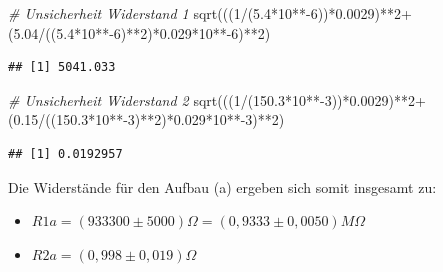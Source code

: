 \documentclass[class=article, crop=false]{standalone}
\newenvironment{Shaded}{\begin{snugshade}}{\end{snugshade}}
\newcommand{\CommentTok}[1]{\textcolor[rgb]{0.56,0.35,0.01}{\textit{#1}}}
\newcommand{\DecValTok}[1]{\textcolor[rgb]{0.00,0.00,0.81}{#1}}
\newcommand{\FloatTok}[1]{\textcolor[rgb]{0.00,0.00,0.81}{#1}}
\newcommand{\FunctionTok}[1]{\textcolor[rgb]{0.00,0.00,0.00}{#1}}
\newcommand{\NormalTok}[1]{#1}
\newcommand{\SpecialCharTok}[1]{\textcolor[rgb]{0.00,0.00,0.00}{#1}}
\begin{document}
\begin{Shaded}
\begin{Highlighting}[]
\CommentTok{\# Unsicherheit Widerstand 1}
\FunctionTok{sqrt}\NormalTok{(((}\DecValTok{1}\SpecialCharTok{/}\NormalTok{(}\FloatTok{5.4}\SpecialCharTok{*}\DecValTok{10}\SpecialCharTok{**{-}}\DecValTok{6}\NormalTok{))}\SpecialCharTok{*}\FloatTok{0.0029}\NormalTok{)}\SpecialCharTok{**}\DecValTok{2}\SpecialCharTok{+}\NormalTok{(}\FloatTok{5.04}\SpecialCharTok{/}\NormalTok{((}\FloatTok{5.4}\SpecialCharTok{*}\DecValTok{10}\SpecialCharTok{**{-}}\DecValTok{6}\NormalTok{)}\SpecialCharTok{**}\DecValTok{2}\NormalTok{)}\SpecialCharTok{*}\FloatTok{0.029}\SpecialCharTok{*}\DecValTok{10}\SpecialCharTok{**{-}}\DecValTok{6}\NormalTok{)}\SpecialCharTok{**}\DecValTok{2}\NormalTok{)}
\end{Highlighting}
\end{Shaded}

\begin{verbatim}
## [1] 5041.033
\end{verbatim}

\begin{Shaded}
\begin{Highlighting}[]
\CommentTok{\# Unsicherheit Widerstand 2}
\FunctionTok{sqrt}\NormalTok{(((}\DecValTok{1}\SpecialCharTok{/}\NormalTok{(}\FloatTok{150.3}\SpecialCharTok{*}\DecValTok{10}\SpecialCharTok{**{-}}\DecValTok{3}\NormalTok{))}\SpecialCharTok{*}\FloatTok{0.0029}\NormalTok{)}\SpecialCharTok{**}\DecValTok{2}\SpecialCharTok{+}\NormalTok{(}\FloatTok{0.15}\SpecialCharTok{/}\NormalTok{((}\FloatTok{150.3}\SpecialCharTok{*}\DecValTok{10}\SpecialCharTok{**{-}}\DecValTok{3}\NormalTok{)}\SpecialCharTok{**}\DecValTok{2}\NormalTok{)}\SpecialCharTok{*}\FloatTok{0.029}\SpecialCharTok{*}\DecValTok{10}\SpecialCharTok{**{-}}\DecValTok{3}\NormalTok{)}\SpecialCharTok{**}\DecValTok{2}\NormalTok{)}
\end{Highlighting}
\end{Shaded}

\begin{verbatim}
## [1] 0.0192957
\end{verbatim}

Die Widerstände für den Aufbau (a) ergeben sich somit insgesamt zu:

\begin{itemize}
\item $R1a = (933300 \pm 5000)\Omega = (0,9333 \pm 0,0050)M\Omega$
\item $R2a = (0,998 \pm 0,019) \Omega$
\end{itemize}
\end{document}
